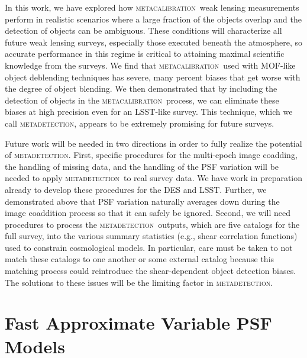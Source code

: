 \documentclass[fleqn,useAMS,usenatbib]{mnras}
\newcommand{\mcal}{\textsc{metacalibration}}
\newcommand{\mdet}{\textsc{metadetection}}
\begin{document}
In this work, we have explored how \mcal\ weak lensing measurements perform in
realistic scenarios where a large fraction of the objects overlap and the
detection of objects can be ambiguous. These conditions will characterize all
future weak lensing surveys, especially those executed beneath the atmosphere,
so accurate performance in this regime is critical to attaining maximal
scientific knowledge from the surveys. We find that \mcal\ used with MOF-like
object deblending techniques has severe, many percent biases that get worse
with the degree of object blending. We then demonstrated that by including the
detection of objects in the \mcal\ process, we can eliminate these biases at
high precision even for an LSST-like survey. This technique, which we call
\mdet, appears to be extremely promising for future surveys.

Future work will be needed in two directions in order to fully realize the
potential of \mdet. First, specific procedures for the multi-epoch image coadding,
the handling of missing data, and the handling of the PSF variation will be needed to
apply \mdet\ to real survey data. We have work in preparation already to develop
these procedures for the DES and LSST. Further, we demonstrated above that PSF
variation naturally averages down during the image coaddition process so that it
can safely be ignored. Second, we will need procedures to process the \mdet\ outputs,
which are five catalogs for the full survey, into the various summary statistics
(e.g., shear correlation functions) used to constrain cosmological models. In particular,
care must be taken to not match these catalogs to one another or some external catalog
because this matching process could reintroduce the shear-dependent object detection biases.
The solutions to these issues will be the limiting factor in \mdet.




\appendix

\section{Fast Approximate Variable PSF Models}\label{app:pspsf}
\end{document}
